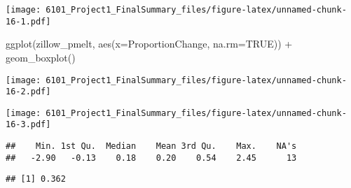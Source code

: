 \documentclass[
]{article}
\newenvironment{Shaded}{\begin{snugshade}}{\end{snugshade}}
\newcommand{\AttributeTok}[1]{\textcolor[rgb]{0.77,0.63,0.00}{#1}}
\newcommand{\ConstantTok}[1]{\textcolor[rgb]{0.00,0.00,0.00}{#1}}
\newcommand{\FunctionTok}[1]{\textcolor[rgb]{0.00,0.00,0.00}{#1}}
\newcommand{\NormalTok}[1]{#1}
\newcommand{\SpecialCharTok}[1]{\textcolor[rgb]{0.00,0.00,0.00}{#1}}
\begin{document}
\texttt{[image: 6101\_Project1\_FinalSummary\_files/figure-latex/unnamed-chunk-16-1.pdf]}

\begin{Shaded}
\begin{Highlighting}[]
\FunctionTok{ggplot}\NormalTok{(zillow\_pmelt, }\FunctionTok{aes}\NormalTok{(}\AttributeTok{x=}\NormalTok{ProportionChange, }\AttributeTok{na.rm=}\ConstantTok{TRUE}\NormalTok{)) }\SpecialCharTok{+} \FunctionTok{geom\_boxplot}\NormalTok{()}
\end{Highlighting}
\end{Shaded}

\texttt{[image: 6101\_Project1\_FinalSummary\_files/figure-latex/unnamed-chunk-16-2.pdf]}

\begin{Shaded}
\end{Shaded}

\texttt{[image: 6101\_Project1\_FinalSummary\_files/figure-latex/unnamed-chunk-16-3.pdf]}

\begin{Shaded}
\end{Shaded}

\begin{verbatim}
##    Min. 1st Qu.  Median    Mean 3rd Qu.    Max.    NA's 
##   -2.90   -0.13    0.18    0.20    0.54    2.45      13
\end{verbatim}

\begin{Shaded}
\end{Shaded}

\begin{verbatim}
## [1] 0.362
\end{verbatim}

\begin{Shaded}
\end{Shaded}
\end{document}
